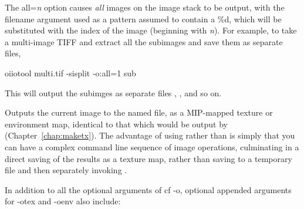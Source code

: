 The {\cf all=}\emph{n} option causes \emph{all} images on the image stack
to be output, with the
filename argument used as a pattern assumed to contain a {\cf \%d},
which will be substituted with the index of the image (beginning with
\emph{n}). For example, to take a multi-image TIFF and extract all the
subimages and save them as separate files,

\begin{code}
    oiiotool multi.tif -sisplit -o:all=1 sub%
\end{code}
\vspace{-12pt}
\noindent This will output the subimges as separate files ,
, and so on.

\apiend

\label{sec:oiiotool:otex}

Outputs the current image to the named file, as a MIP-mapped texture or
environment map, identical to that which would be output by \maketx
(Chapter~\ref{chap:maketx}). The advantage of using \oiiotool rather than
\maketx is simply that you can have a complex \oiiotool command line
sequence of image operations, culminating in a direct saving of the results
as a texture map, rather than saving to a temporary file and then separately
invoking \maketx.

\noindent In addition to all the optional arguments of {cf -o}, optional
appended arguments for {\cf -otex} and {\cf -oenv} also include:

\smallskip

